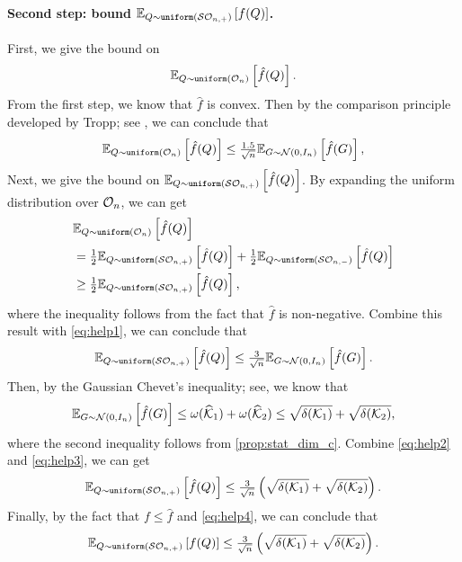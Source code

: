 \paragraph{Second step: bound $\mathbb{E}_{Q \sim \operatorname{\texttt{uniform}}(\mathcal{S}\mathcal{O}_{n, +})}\left[f(Q)\right]$.} 
First, we give the bound on 
\[\mathbb{E}_{Q \sim \operatorname{\texttt{uniform}}(\mathcal{O}_n)}\left[\hat f(Q)\right].\] 
From the first step, we know that $\hat f$ is convex. Then by the comparison principle developed by Tropp; see \cite[Theorem~5 and Lemma~8]{tropp2012comparison}, we can conclude that 
\begin{equation} \label{eq:help1}
  \mathbb{E}_{Q \sim \operatorname{\texttt{uniform}}(\mathcal{O}_n)}\left[\hat f(Q)\right] \leq \tfrac{1.5}{\sqrt{n}}\mathbb{E}_{G\sim\mathcal{N}(0, I_n)}\left[\hat f(G)\right],
\end{equation}
Next, we give the bound on $\mathbb{E}_{Q \sim \operatorname{\texttt{uniform}}(\mathcal{S}\mathcal{O}_{n, +})}\left[\hat f(Q)\right]$. By expanding the uniform distribution over $\mathcal{O}_n$, we can get
\begin{align*}
  &\mathbb{E}_{Q \sim \operatorname{\texttt{uniform}}(\mathcal{O}_n)}\left[\hat f(Q)\right] 
  \\&= \tfrac{1}{2}\mathbb{E}_{Q \sim \operatorname{\texttt{uniform}}(\mathcal{S}\mathcal{O}_{n, +})}\left[\hat f(Q)\right] + \tfrac{1}{2}\mathbb{E}_{Q \sim \operatorname{\texttt{uniform}}(\mathcal{S}\mathcal{O}_{n, -})}\left[\hat f(Q)\right]
  \\&\geq \tfrac{1}{2}\mathbb{E}_{Q \sim \operatorname{\texttt{uniform}}(\mathcal{S}\mathcal{O}_{n, +})}\left[\hat f(Q)\right],
\end{align*}
where the inequality follows from the fact that $\hat f$ is non-negative. Combine this result with \eqref{eq:help1}, we can conclude that 
\begin{equation} \label{eq:help2}
  \mathbb{E}_{Q \sim \operatorname{\texttt{uniform}}(\mathcal{S}\mathcal{O}_{n, +})}\left[\hat f(Q)\right] \leq \tfrac{3}{\sqrt{n}}\mathbb{E}_{G\sim\mathcal{N}(0, I_n)}\left[\hat f(G)\right].
\end{equation}
Then, by the Gaussian Chevet’s inequality; see\cite[Exercise~8.7.4]{vershynin2018high}, we know that 
\begin{equation} \label{eq:help3}
  \mathbb{E}_{G\sim\mathcal{N}(0, I_n)}\left[\hat f(G)\right] \leq \omega(\widehat{\mathcal{K}}_1) + \omega(\widehat{\mathcal{K}}_2) \leq \sqrt{\delta(\mathcal{K}_1)} + \sqrt{\delta(\mathcal{K}_2)},
\end{equation}
where the second inequality follows from \autoref{prop:stat_dim_c}. Combine \eqref{eq:help2} and \eqref{eq:help3}, we can get
\begin{equation} \label{eq:help4}
  \mathbb{E}_{Q \sim \operatorname{\texttt{uniform}}(\mathcal{S}\mathcal{O}_{n, +})}\left[\hat f(Q)\right] \leq \tfrac{3}{\sqrt{n}}\left( \sqrt{\delta(\mathcal{K}_1)} + \sqrt{\delta(\mathcal{K}_2)} \right).
\end{equation}
Finally, by the fact that $f \leq \hat f$ and \eqref{eq:help4}, we can conclude that 
\begin{equation} \label{eq:help5}
  \mathbb{E}_{Q \sim \operatorname{\texttt{uniform}}(\mathcal{S}\mathcal{O}_{n, +})}\left[f(Q)\right] \leq \tfrac{3}{\sqrt{n}}\left( \sqrt{\delta(\mathcal{K}_1)} + \sqrt{\delta(\mathcal{K}_2)} \right).
\end{equation}

